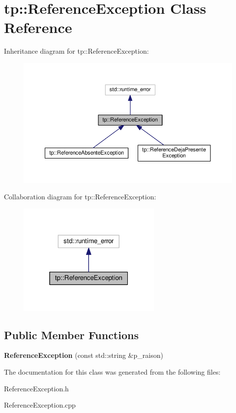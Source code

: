 \hypertarget{classtp_1_1ReferenceException}{}\section{tp\+:\+:Reference\+Exception Class Reference}
\label{classtp_1_1ReferenceException}


Inheritance diagram for tp\+:\+:Reference\+Exception\+:\nopagebreak
\begin{figure}[H]
\begin{center}
\leavevmode
\includegraphics[width=350pt]{classtp_1_1ReferenceException__inherit__graph}
\end{center}
\end{figure}


Collaboration diagram for tp\+:\+:Reference\+Exception\+:\nopagebreak
\begin{figure}[H]
\begin{center}
\leavevmode
\includegraphics[width=199pt]{classtp_1_1ReferenceException__coll__graph}
\end{center}
\end{figure}
\subsection*{Public Member Functions}
\begin{DoxyCompactItemize}
\item 
\hypertarget{classtp_1_1ReferenceException_ac3553090925711e06bdad4d1cd38c78e}{}{\bfseries Reference\+Exception} (const std\+::string \&p\+\_\+raison)\label{classtp_1_1ReferenceException_ac3553090925711e06bdad4d1cd38c78e}

\end{DoxyCompactItemize}


The documentation for this class was generated from the following files\+:\begin{DoxyCompactItemize}
\item 
Reference\+Exception.\+h\item 
Reference\+Exception.\+cpp\end{DoxyCompactItemize}
